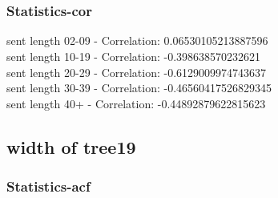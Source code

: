 \documentclass{article}%
\begin{document}
\begin{figure}[ht]%
\centering%
\setlength{\abovecaptionskip}{-35pt}%
%
%
\\%
%
%
\\%
%
\end{figure}

%
\newpage%
\subsubsection{Statistics{-}cor}%
\label{ssubsec:Statistics{-}cor}%
\noindent%
sent length 02-09 - Correlation: 0.06530105213887596\\%
sent length 10-19 - Correlation: -0.398638570232621\\%
sent length 20-29 - Correlation: -0.6129009974743637\\%
sent length 30-39 - Correlation: -0.46560417526829345\\%
sent length 40+ - Correlation: -0.44892879622815623\\

%
\newpage

%
\subsection{width of tree19}%
\label{subsec:widthoftree19}%
\subsubsection{Statistics{-}acf}%
\label{ssubsec:Statistics{-}acf}%
\end{document}
